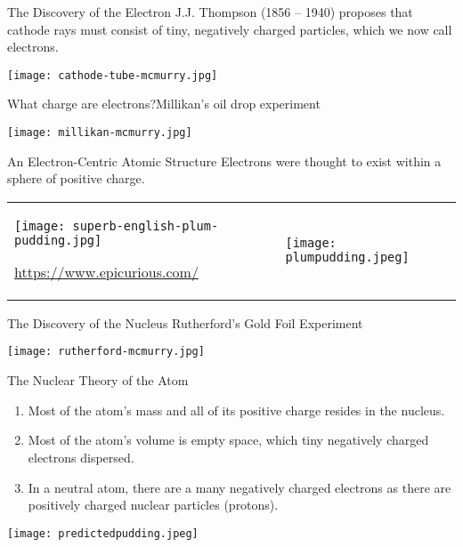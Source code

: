 \documentclass[notes=only]{beamer}
\begin{document}
\begin{frame}{The Discovery of the Electron}
	J.J. Thompson (1856 -- 1940) proposes that cathode rays must consist of
	tiny, negatively charged particles, which we now call \alert{electrons}.

	\begin{center}
		\texttt{[image: cathode-tube-mcmurry.jpg]}
	\end{center}
\end{frame}

\begin{frame}{What charge are electrons?}{Millikan's oil drop experiment}
	\begin{center}
		\texttt{[image: millikan-mcmurry.jpg]}
	\end{center}
\end{frame}

\begin{frame}{An Electron-Centric Atomic Structure}
	Electrons were thought to exist within a sphere of
	positive charge.

	\begin{tabularx}{\linewidth} {X@{\qquad}X}
		\texttt{[image: superb-english-plum-pudding.jpg]}

		\tiny\url{https://www.epicurious.com/}
		& \texttt{[image: plumpudding.jpeg]} \\
	\end{tabularx}
\end{frame}


\begin{frame}{The Discovery of the Nucleus}
	{Rutherford's Gold Foil Experiment}

	\begin{center}
		\texttt{[image: rutherford-mcmurry.jpg]}
	\end{center}
\end{frame}

\begin{frame}{The Nuclear Theory of the Atom}
	\begin{enumerate}
		\item Most of the atom's mass and all of its positive charge
			resides in the nucleus.
		\item Most of the atom's volume is empty space, which tiny
			negatively charged electrons dispersed.
		\item In a neutral atom, there are a many negatively charged
			electrons as there are positively charged nuclear
			particles (protons).
	\end{enumerate}

	\begin{center}
		\texttt{[image: predictedpudding.jpeg]}
	\end{center}
\end{frame}
\end{document}
